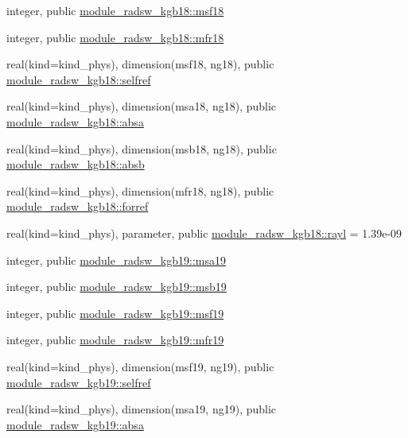 \begin{DoxyCompactItemize}
\item 
integer, public \hyperlink{namespacemodule__radsw__kgb18_a1d74002f71710887e45df89d3897a10a}{module\+\_\+radsw\+\_\+kgb18\+::msf18}
\item 
integer, public \hyperlink{namespacemodule__radsw__kgb18_a9fa8140413e7ec769baea4f207e58393}{module\+\_\+radsw\+\_\+kgb18\+::mfr18}
\item 
real(kind=kind\+\_\+phys), dimension(msf18, ng18), public \hyperlink{namespacemodule__radsw__kgb18_a488f807878d909b8f69457b0d7d8ac6a}{module\+\_\+radsw\+\_\+kgb18\+::selfref}
\item 
real(kind=kind\+\_\+phys), dimension(msa18, ng18), public \hyperlink{namespacemodule__radsw__kgb18_a8a7787776bd057b1815e92a5f58b9cac}{module\+\_\+radsw\+\_\+kgb18\+::absa}
\item 
real(kind=kind\+\_\+phys), dimension(msb18, ng18), public \hyperlink{namespacemodule__radsw__kgb18_a858680db0ee5e9a599639844a91f8f06}{module\+\_\+radsw\+\_\+kgb18\+::absb}
\item 
real(kind=kind\+\_\+phys), dimension(mfr18, ng18), public \hyperlink{namespacemodule__radsw__kgb18_a0efc293c91de3d17b29ed713ff09d7a9}{module\+\_\+radsw\+\_\+kgb18\+::forref}
\item 
real(kind=kind\+\_\+phys), parameter, public \hyperlink{namespacemodule__radsw__kgb18_a9cd3f07e259e4982c7ef2889fee6cccb}{module\+\_\+radsw\+\_\+kgb18\+::rayl} = 1.\+39e-\/09
\item 
integer, public \hyperlink{namespacemodule__radsw__kgb19_a498993cce64baa8f22c8dfdce632cf85}{module\+\_\+radsw\+\_\+kgb19\+::msa19}
\item 
integer, public \hyperlink{namespacemodule__radsw__kgb19_a42771fcf9dd17b5c9d0d03cb2bf1c923}{module\+\_\+radsw\+\_\+kgb19\+::msb19}
\item 
integer, public \hyperlink{namespacemodule__radsw__kgb19_a86778b12ff439f4f83fda891e7ae2bfe}{module\+\_\+radsw\+\_\+kgb19\+::msf19}
\item 
integer, public \hyperlink{namespacemodule__radsw__kgb19_a57f837ef4316dc2441bca3fde3998156}{module\+\_\+radsw\+\_\+kgb19\+::mfr19}
\item 
real(kind=kind\+\_\+phys), dimension(msf19, ng19), public \hyperlink{namespacemodule__radsw__kgb19_adb26cae00c05ac5c048a4db5a319a2eb}{module\+\_\+radsw\+\_\+kgb19\+::selfref}
\item 
real(kind=kind\+\_\+phys), dimension(msa19, ng19), public \hyperlink{namespacemodule__radsw__kgb19_ad9a6fc80122a2f06d9f2277d74e00c85}{module\+\_\+radsw\+\_\+kgb19\+::absa}

\end{DoxyCompactItemize}
